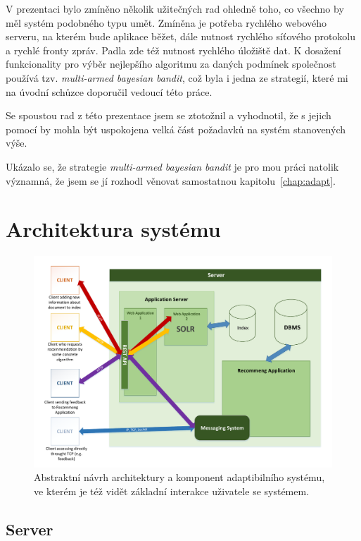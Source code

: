 \documentclass[thesis=M,czech]{FITthesis}[2014/05/07]
\begin{document}
V prezentaci bylo zmíněno několik užitečných rad ohledně toho, co všechno by měl systém podobného typu umět. Zmíněna je potřeba rychlého webového serveru, na kterém bude aplikace běžet, dále nutnost rychlého síťového protokolu a rychlé fronty zpráv. Padla zde též nutnost rychlého úložiště dat. K dosažení funkcionality pro výběr nejlepšího algoritmu za daných podmínek společnost používá tzv. \emph{multi-armed bayesian bandit}, což byla i jedna ze strategií, které mi na úvodní schůzce doporučil vedoucí této práce.

Se spoustou rad z této prezentace jsem se ztotožnil a vyhodnotil, že s jejich pomocí by mohla být uspokojena velká část požadavků na systém stanovených výše.

Ukázalo se, že strategie \emph{multi-armed bayesian bandit} je pro mou práci natolik významná, že jsem se jí rozhodl věnovat samostatnou kapitolu~\ref{chap:adapt}.

\section{Architektura systému}

\begin{figure}\centering
	\includegraphics[width=1.0\textwidth]{obr/DIPLOMKA_env.pdf}
 	\caption[Abstraktní návrh architektury a komponent adaptibilního systému]{Abstraktní návrh architektury a komponent adaptibilního systému, ve kterém je též vidět základní interakce uživatele se systémem.}\label{fig:recommeng}
\end{figure}	

\subsection{Server}
\end{document}
